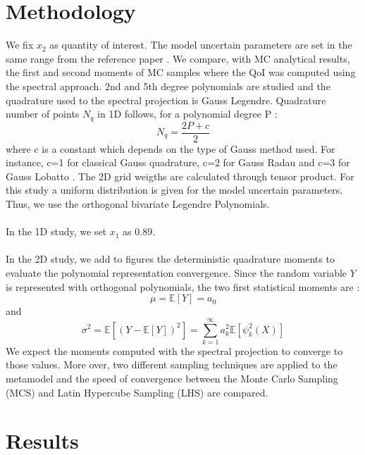 \documentclass[11pt, a4paper, English]{report}
\begin{document}
\begin{appendix}
\section{Methodology}
We fix $x_2$ as quantity of interest. The model uncertain parameters are set in the same range from the reference paper \cite{Tim1}. We compare, with MC analytical results, the first and second moments of MC samples where the QoI was computed using the spectral approach. 2nd and 5th degree polynomials are studied and the quadrature used to the spectral projection is Gauss Legendre. Quadrature number of points $N_q$ in 1D follows, for a polynomial degree P :
$$ N_q =\frac{2P+c}{2}$$
where c is a constant which depends on the type of Gauss method used. For instance, c=1 for classical Gauss quadrature, c=2 for Gauss Radau and c=3 for Gauss Lobatto \cite{CoursLucor}. The 2D grid weigths are calculated through tensor product. For this study a uniform distribution is given for the model uncertain parameters. Thus, we use the orthogonal bivariate Legendre Polynomials.
\\\\ 
In the 1D study, we set $x_1$ as 0.89. \\\\
In the 2D study, we add to figures the deterministic quadrature moments to evaluate the polynomial representation convergence. Since the random variable $Y$ is represented with orthogonal polynomials, the two first statistical moments are \cite{CoursLucor} : 
$$\mu =\mathbb{E}[Y] = a_0 $$
and 
$$\sigma^2 = \mathbb{E}[(Y - \mathbb{E}[Y])^2] = \sum_{k=1}^\infty a_k^2\mathbb{E}[\psi_k^2(X)]$$
We expect the moments computed with the spectral projection to converge to those values. More over, two different sampling techniques are applied to the metamodel and the speed of convergence between the Monte Carlo Sampling (MCS) and Latin Hypercube Sampling (LHS) are compared.
\section{Results}

\end{appendix}
\end{document}
